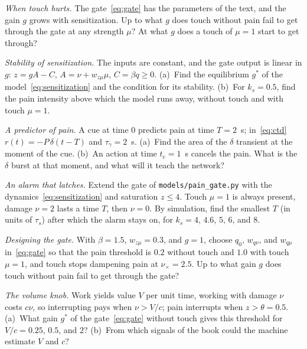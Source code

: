 \begin{exercise}[\lvlB]
\label{ex:14:2}
\emph{When touch hurts.} The gate~\eqref{eq:gate} has the parameters of the text, and the gain $g$ grows with sensitization. Up to what $g$ does touch without pain fail to get through the gate at any strength $\mu$? At what $g$ does a touch of $\mu=1$ start to get through?
\end{exercise}

\begin{exercise}[\lvlB]
\label{ex:14:3}
\emph{Stability of sensitization.} The inputs are constant, and the gate output is linear in $g$: $z=gA-C$, $A=\nu+w_{z\mu}\mu$, $C=\beta q\ge0$. (a)~Find the equilibrium $g^*$ of the model~\eqref{eq:sensitization} and the condition for its stability. (b)~For $k_s=0.5$, find the pain intensity above which the model runs away, without touch and with touch $\mu=1$.
\end{exercise}

\begin{exercise}[\lvlA]
\label{ex:14:4}
\emph{A predictor of pain.} A cue at time $0$ predicts pain at time $T=2$~s; in~\eqref{eq:ctd} $r(t)=-P\,\delta(t-T)$ and $\tau_\gamma=2$~s. (a)~Find the area of the $\delta$ transient at the moment of the cue. (b)~An action at time $t_e=1$~s cancels the pain. What is the $\delta$ burst at that moment, and what will it teach the network?
\end{exercise}

\begin{exercise}[\lvlB]
\label{ex:14:5}
\emph{An alarm that latches.} Extend the gate of \texttt{models/\allowbreak pain\_gate.py} with the dynamics~\eqref{eq:sensitization} and saturation $z\le4$. Touch $\mu=1$ is always present, damage $\nu=2$ lasts a time $T$, then $\nu=0$. By simulation, find the smallest $T$ (in units of $\tau_s$) after which the alarm stays on, for $k_s=4$, $4.6$, $5$, $6$, and $8$.
\end{exercise}

\begin{exercise}[\lvlB]
\label{ex:14:6}
\emph{Designing the gate.} With $\beta=1.5$, $w_{z\mu}=0.3$, and $g=1$, choose $q_0$, $w_{q\nu}$, and $w_{q\mu}$ in~\eqref{eq:gate} so that the pain threshold is $0.2$ without touch and $1.0$ with touch $\mu=1$, and touch stops dampening pain at $\nu_\times=2.5$. Up to what gain $g$ does touch without pain fail to get through the gate?
\end{exercise}

\begin{exercise}[\lvlC]
\label{ex:14:7}
\emph{The volume knob.} Work yields value $V$ per unit time, working with damage $\nu$ costs $c\nu$, so interrupting pays when $\nu>V/c$; pain interrupts when $z>\theta=0.5$. (a)~What gain $g^*$ of the gate~\eqref{eq:gate} without touch gives this threshold for $V/c=0.25$, $0.5$, and $2$? (b)~From which signals of the book could the machine estimate $V$ and $c$?
\end{exercise}
